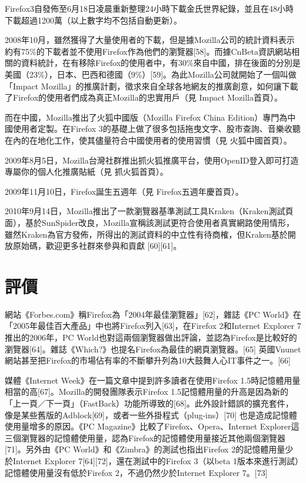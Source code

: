 \documentclass[12pt, a4paper]{article}
\begin{document}
Firefox3自發佈至6月18日凌晨重新整理24小時下載金氏世界紀錄，並且在48小時下載超過1200萬（以上數字均不包括自動更新）。

2008年10月，雖然獲得了大量使用者的下載，但是據Mozilla公司的統計資料表示約有75\%的下載者並不使用Firefox作為他們的瀏覽器[58]。而據CnBeta資訊網站相關的資料統計，在有移除Firefox的使用者中，有30\%來自中國，排在後面的分別是美國（23\%），日本、巴西和德國（9\%）[59]。為此Mozilla公司就開始了一個叫做「Impact Mozilla」的推廣計劃，徵求來自全球各地網友的推廣創意，如何讓下載了Firefox的使用者們成為真正Mozilla的忠實用戶（見 Impact Mozilla首頁）。

而在中國，Mozilla推出了火狐中國版（Mozilla Firefox China Edition）專門為中國使用者定製。在Firefox 3的基礎上做了很多包括拖曳文字、股市查詢、音樂收聽在內的在地化工作，使其儘量符合中國使用者的使用習慣（見 火狐中國首頁）。

2009年8月5日，Mozilla台灣社群推出抓火狐推廣平台，使用OpenID登入即可打造專屬你的個人化推廣貼紙（見 抓火狐首頁）。

2009年11月10日，Firefox誕生五週年（見 Firefox五週年慶首頁）。

2010年9月14日，Mozilla推出了一款瀏覽器基準測試工具Kraken（Kraken測試頁面），基於SunSpider改良，Mozilla宣稱該測試更符合使用者真實網路使用情形，雖然Kraken為官方發佈，所得出的測試資料的中立性有待商榷，但Kraken基於開放原始碼，歡迎更多社群來參與和貢獻 [60][61]。

\section{評價}

網站《Forbes.com》稱Firefox為「2004年最佳瀏覽器」[62]，雜誌《PC World》在「2005年最佳百大產品」中也將Firefox列入[63]，在Firefox 2和Internet Explorer 7推出的2006年，PC World也對這兩個瀏覽器做出評論，並認為Firefox是比較好的瀏覽器[64]。雜誌《Which?》也提名Firefox為最佳的網頁瀏覽器。[65] 英國Vnunet網站甚至把Firefox的市場佔有率的不斷攀升列為10大鼓舞人心IT事件之一。[66]

媒體《Internet Week》在一篇文章中提到許多讀者在使用Firefox 1.5時記憶體用量相當的高[67]。Mozilla的開發團隊表示Firefox 1.5記憶體用量的升高是因為新的「上一頁／下一頁」（FastBack）功能所導致的[68]。此外設計錯誤的擴充套件，像是某些舊版的Adblock[69]，或者一些外掛程式（plug-ins）[70] 也是造成記憶體使用量增多的原因。《PC Magazine》比較了Firefox、Opera、Internet Explorer這三個瀏覽器的記憶體使用量，認為Firefox的記憶體使用量接近其他兩個瀏覽器[71]。另外由《PC World》和《Zimbra》的測試也指出Firefox 2的記憶體用量少於Internet Explorer 7[64][72]，還在測試中的Firefox 3（以beta 1版本來進行測試）記憶體使用量沒有低於Firefox 2，不過仍然少於Internet Explorer 7。[73]
\end{document}
